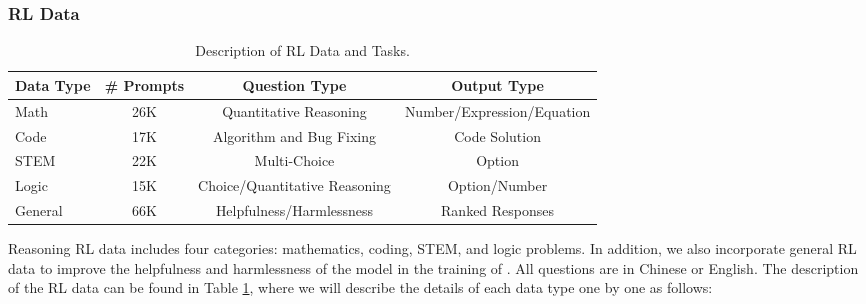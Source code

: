 \subsubsection{RL Data} \label{sec: rl_data}
\begin{table}[t]
    \centering
    \setlength{\tabcolsep}{6pt}
    
    \caption{
    Description of RL Data  and Tasks.
    }
    \label{tab:rl_data}
    \begin{tabular}{l | c| c | c}
        \toprule
        \textbf{Data Type} & \textbf{\# Prompts} & \textbf{Question Type} & \textbf{Output Type} \\
        \midrule
        Math & 26K & Quantitative Reasoning & Number/Expression/Equation \\
        Code & 17K & Algorithm and Bug Fixing & Code Solution\\
        STEM & 22K & Multi-Choice & Option \\
        Logic & 15K & Choice/Quantitative Reasoning & Option/Number \\
        General & 66K & Helpfulness/Harmlessness & Ranked Responses \\
        \bottomrule
    \end{tabular}
\end{table}

Reasoning RL data includes four categories: mathematics, coding, STEM, and logic problems. In addition, we also incorporate general RL data to improve the helpfulness and harmlessness of the model in the training of \dsri{}. All questions are in Chinese or English. The description of the RL data can be found in Table \ref{tab:rl_data}, where we will describe the details of each data type one by one as follows:


